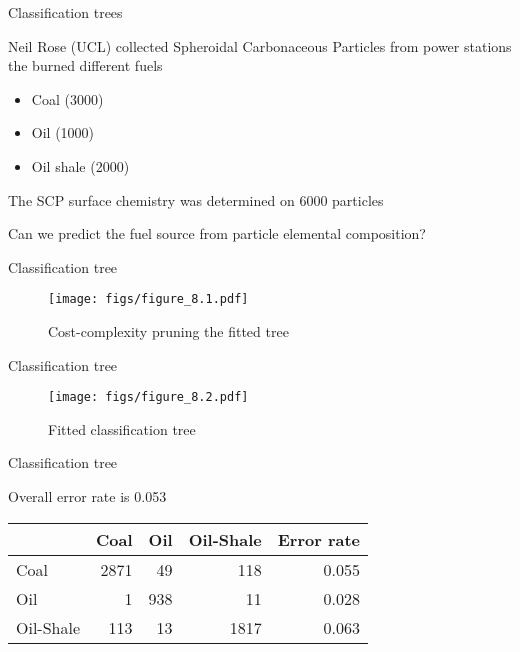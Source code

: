 \documentclass[11pt,ignorenonframetext,compress, aspectratio=169]{beamer}
\providecommand{\tightlist}{%
  \setlength{\itemsep}{0pt}\setlength{\parskip}{0pt}}
\begin{document}
\begin{frame}{Classification trees}

Neil Rose (UCL) collected Spheroidal Carbonaceous Particles from power
stations the burned different fuels

\begin{itemize}
\tightlist
\item
  Coal (3000)
\item
  Oil (1000)
\item
  Oil shale (2000)
\end{itemize}

The SCP surface chemistry was determined on 6000 particles

Can we predict the fuel source from particle elemental composition?

\end{frame}

\begin{frame}{Classification tree}

\begin{figure}[htbp]
\centering
\texttt{[image: figs/figure\_8.1.pdf]}
\caption{Cost-complexity pruning the fitted tree}
\end{figure}

\end{frame}

\begin{frame}{Classification tree}

\begin{figure}[htbp]
\centering
\texttt{[image: figs/figure\_8.2.pdf]}
\caption{Fitted classification tree}
\end{figure}

\end{frame}

\begin{frame}{Classification tree}

Overall error rate is 0.053

\begin{longtable}[]{@{}lrrrr@{}}
\toprule
& Coal & Oil & Oil-Shale & Error rate\tabularnewline
\midrule
\endhead
Coal & 2871 & 49 & 118 & 0.055\tabularnewline
Oil & 1 & 938 & 11 & 0.028\tabularnewline
Oil-Shale & 113 & 13 & 1817 & 0.063\tabularnewline
\bottomrule
\end{longtable}

\end{frame}
\end{document}
